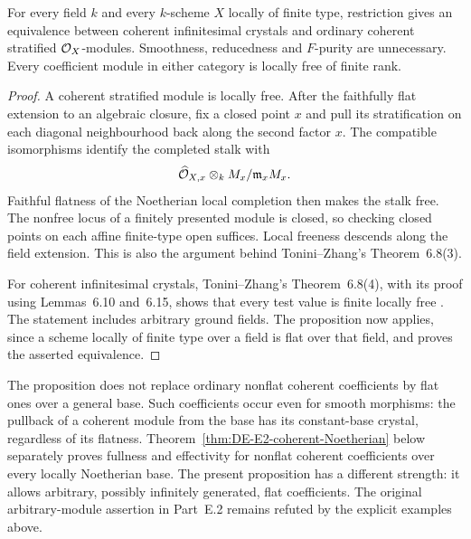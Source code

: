 \begin{corollary}\label{cor:DE-E2-coherent-any-field}
For every field $k$ and every $k$-scheme $X$ locally of finite type, restriction gives an equivalence between coherent infinitesimal crystals and ordinary coherent stratified $\mathcal O_X$-modules.  Smoothness, reducedness and $F$-purity are unnecessary.  Every coefficient module in either category is locally free of finite rank.
\end{corollary}
\begin{proof}
A coherent stratified module is locally free.  After the faithfully flat extension to an algebraic closure, fix a closed point $x$ and pull its stratification on each diagonal neighbourhood back along the second factor $x$.  The compatible isomorphisms identify the completed stalk with
\[
        \widehat{\mathcal O}_{X,x}\otimes_k M_x/\mathfrak m_xM_x.
\]
Faithful flatness of the Noetherian local completion then makes the stalk free.  The nonfree locus of a finitely presented module is closed, so checking closed points on each affine finite-type open suffices.  Local freeness descends along the field extension.  This is also the argument behind Tonini--Zhang's Theorem~6.8(3).

For coherent infinitesimal crystals, Tonini--Zhang's Theorem~6.8(4), with its proof using Lemmas~6.10 and~6.15, shows that every test value is finite locally free \citep{ToniniZhang2019}.  The statement includes arbitrary ground fields.  The proposition now applies, since a scheme locally of finite type over a field is flat over that field, and proves the asserted equivalence.
\end{proof}

\begin{remark}\label{rem:DE-E2-flat-Noetherian-scope}
The proposition does not replace ordinary nonflat coherent coefficients by flat ones over a general base.  Such coefficients occur even for smooth morphisms: the pullback of a coherent module from the base has its constant-base crystal, regardless of its flatness.  Theorem~\ref{thm:DE-E2-coherent-Noetherian} below separately proves fullness and effectivity for nonflat coherent coefficients over every locally Noetherian base.  The present proposition has a different strength: it allows arbitrary, possibly infinitely generated, flat coefficients.  The original arbitrary-module assertion in Part~E.2 remains refuted by the explicit examples above.
\end{remark}


